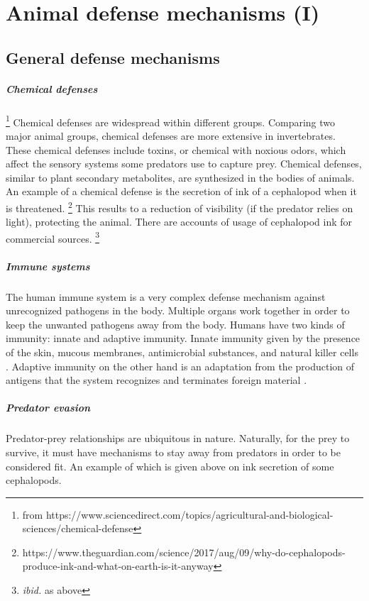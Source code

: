 \chapter{Animal defense mechanisms (I)}

\section{General defense mechanisms}

\paragraph{Chemical defenses}
\footnote{from https://www.sciencedirect.com/topics/agricultural-and-biological-sciences/chemical-defense}
Chemical defenses are widespread within different groups.
Comparing two major animal groups, chemical defenses are more extensive in invertebrates.
These chemical defenses include toxins, or chemical with noxious odors, which affect the sensory systems some predators use to capture prey.
Chemical defenses, similar to plant secondary metabolites, are synthesized in the bodies of animals.
An example of a chemical defense is the secretion of ink of a cephalopod when it is threatened.
\footnote{https://www.theguardian.com/science/2017/aug/09/why-do-cephalopods-produce-ink-and-what-on-earth-is-it-anyway}
This results to a reduction of visibility (if the predator relies on light), protecting the animal.
There are accounts of usage of cephalopod ink for commercial sources.
\footnote{\textit{ibid.} as above}

\paragraph{Immune systems}
The human immune system is a very complex defense mechanism against unrecognized pathogens in the body.
Multiple organs work together in order to keep the unwanted pathogens away from the body.
Humans have two kinds of immunity: innate and adaptive immunity.
Innate immunity given by the presence of the skin, mucous membranes, antimicrobial substances, and natural killer cells \cite[p.396-398]{anaphy}.
Adaptive immunity on the other hand is an adaptation from the production of antigens that the system recognizes and terminates foreign material \cite[p.399-407]{anaphy}.

\paragraph{Predator evasion}
Predator-prey relationships are ubiquitous in nature.
Naturally, for the prey to survive, it must have mechanisms to stay away from predators in order to be considered fit.
An example of which is given above on ink secretion of some cephalopods.

